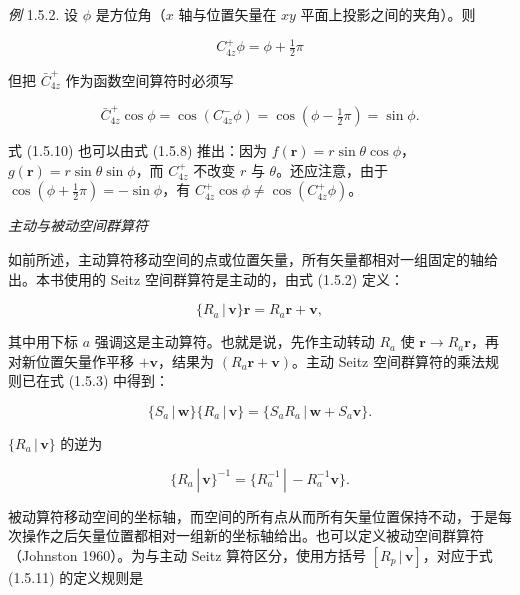 \textit{例} 1.5.2. 设 $\phi$ 是方位角（$x$ 轴与位置矢量在 $xy$ 平面上投影之间的夹角）。则

\begin{equation*}
C_{4z}^{+}\phi = \phi + \tfrac{1}{2}\pi
\tag{1.5.9}
\end{equation*}

但把 $\bar{C}_{4z}^{+}$ 作为函数空间算符时必须写

\begin{equation*}
\bar{C}_{4z}^{+}\cos\phi = \cos(C_{4z}^{-}\phi) = \cos(\phi - \tfrac{1}{2}\pi) = \sin\phi.
\tag{1.5.10}
\end{equation*}

式 (1.5.10) 也可以由式 (1.5.8) 推出：因为 $f(\mathbf{r}) = r\sin\theta\cos\phi$，$g(\mathbf{r}) = r\sin\theta\sin\phi$，而 $C_{4z}^{+}$ 不改变 $r$ 与 $\theta$。还应注意，由于 $\cos(\phi + \tfrac{1}{2}\pi) = -\sin\phi$，有 $C_{4z}^{+}\cos\phi \neq \cos(C_{4z}^{+}\phi)$。

\textit{主动与被动空间群算符}

如前所述，主动算符移动空间的点或位置矢量，所有矢量都相对一组固定的轴给出。本书使用的 Seitz 空间群算符是主动的，由式 (1.5.2) 定义：

\begin{equation*}
\{R_{a} \,|\, \mathbf{v}\}\mathbf{r} = R_{a}\mathbf{r} + \mathbf{v},
\tag{1.5.11}
\end{equation*}

其中用下标 $a$ 强调这是主动算符。也就是说，先作主动转动 $R_{a}$ 使 $\mathbf{r} \rightarrow R_{a}\mathbf{r}$，再对新位置矢量作平移 $+\mathbf{v}$，结果为 $(R_{a}\mathbf{r} + \mathbf{v})$。主动 Seitz 空间群算符的乘法规则已在式 (1.5.3) 中得到：

\begin{equation*}
\{S_{a} \,|\, \mathbf{w}\}\{R_{a} \,|\, \mathbf{v}\} = \{S_{a}R_{a} \,|\, \mathbf{w} + S_{a}\mathbf{v}\}.
\tag{1.5.12}
\end{equation*}

$\{R_{a} \,|\, \mathbf{v}\}$ 的逆为

\begin{equation*}
\{R_{a} \,|\, \mathbf{v}\}^{-1} = \{R_{a}^{-1} \,|\, -R_{a}^{-1}\mathbf{v}\}.
\tag{1.5.13}
\end{equation*}

被动算符移动空间的坐标轴，而空间的所有点从而所有矢量位置保持不动，于是每次操作之后矢量位置都相对一组新的坐标轴给出。也可以定义被动空间群算符（Johnston 1960）。为与主动 Seitz 算符区分，使用方括号 $[R_{p} \,|\, \mathbf{v}]$，对应于式 (1.5.11) 的定义规则是

